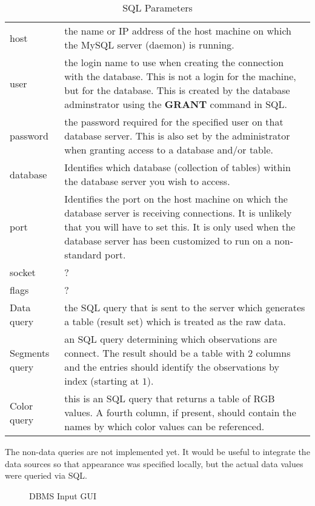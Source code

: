 \documentclass{article}
\def\SqlKeyword#1{\textbf{#1}}
\begin{document}
\begin{table}[htbp]
  \begin{center}
    \leavevmode
\begin{tabular}{ll}\label{tab:mysqlLogin}
host & the name or IP address of the host 
machine on which the MySQL server (daemon)
is running.\\
user &  the login name to use when creating the
connection with the database. This is not a login
for the machine, but for the database. This
is created by the database adminstrator
using the \SqlKeyword{GRANT} command in SQL. \\
password & the password required for the
specified user on that database server.
This is also set by the administrator
when granting access to a database and/or table.
\\
database &   Identifies
which database (collection of tables) within
the database server you wish to access. \\

port & Identifies the port on the host machine on which the database
server is receiving connections.  It is unlikely that you will have to
set this. It is only used when the database server has been customized
to run on a non-standard port. \\ 

socket & ? \\
flags &  ? \\
Data query & the SQL query that is sent to
the server which generates 
a table (result set) which is  treated
as the raw data.  \\
Segments query &  an SQL query
determining which observations are connect.
The result should be a table with $2$ columns
and the entries should identify 
the observations by index (starting at $1$).
 \\
Color query & this is an SQL query that returns a table of RGB values.
A fourth column, if present, should contain the names by which color
values can be referenced.
\end{tabular}
    \caption{SQL Parameters}
    \label{tab:mysqlLogin}
  \end{center}
\end{table}
The non-data queries are not implemented yet.  It would be useful to
integrate the data sources so that appearance was specified locally,
but the actual data values were queried via SQL.
\begin{figure}[htbp]
  \begin{center}
    \leavevmode
    \caption{DBMS Input GUI}
    \label{fig:dbmsGUI}
  \end{center}
\end{figure}
\end{document}
